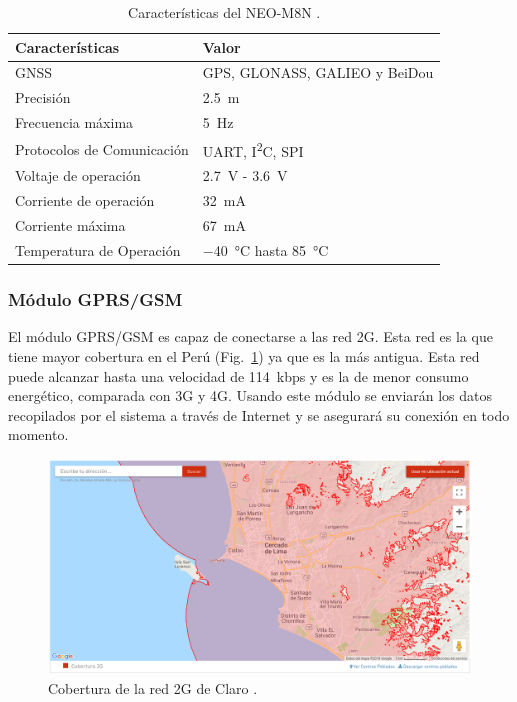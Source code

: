 \bgroup
\def\arraystretch{1.5}%
\begin{table}[htbp!]
\centering
\caption[Características del NEO-M8N]{Características del NEO-M8N \cite{GPS}.}
\begin{tabular}{@{}ll@{}}
\toprule
Características & Valor \\ \midrule
GNSS & GPS, GLONASS, GALIEO y BeiDou \\
Precisión & \SI{2.5}{m} \\
Frecuencia máxima & \SI{5}{Hz} \\
Protocolos de Comunicación & UART, I\textsuperscript{2}C, SPI \\
Voltaje de operación & \SI{2.7}{V} - \SI{3.6}{V} \\
Corriente de operación & \SI{32}{mA} \\
Corriente máxima & \SI{67}{mA} \\
Temperatura de Operación & \SI{-40}{\celsius} hasta \SI{85}{\celsius} \\\bottomrule
\end{tabular}
\label{diag:GPS}
\end{table}
\egroup






\subsubsection{Módulo GPRS/GSM}
El módulo GPRS/GSM es capaz de conectarse a las red 2G. Esta red es la que tiene mayor cobertura en el Perú (Fig.~\ref{fig:Cobertura}) ya que es la más antigua. Esta red puede alcanzar hasta una velocidad de \SI{114}{kbps} y es la de menor consumo energético, comparada con 3G y 4G. Usando este módulo se enviarán los datos recopilados por el sistema a través de Internet y se asegurará su conexión en todo momento.

\begin{figure}[hbtp!]
\centering
\includegraphics[width=\textwidth]{Cobertura_2G.png}
\caption[Cobertura de la red 2G de Claro]{Cobertura de la red 2G de Claro \cite{Cobertura_claro}.}
\label{fig:Cobertura}
\end{figure}

